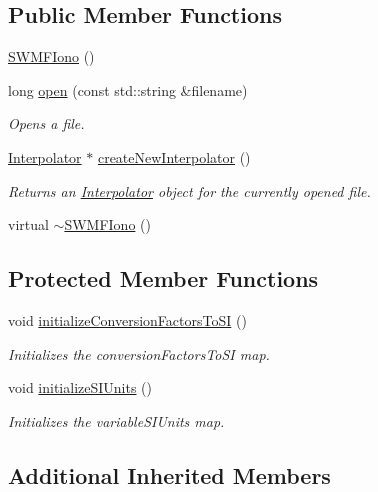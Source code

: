 \subsection*{Public Member Functions}
\begin{DoxyCompactItemize}
\item 
\hyperlink{classccmc_1_1_s_w_m_f_iono_a2af98741608e42f05e0a5c1b9e8bb412}{S\-W\-M\-F\-Iono} ()
\item 
long \hyperlink{classccmc_1_1_s_w_m_f_iono_ad9e939763ca7026d551925d83c9f1425}{open} (const std\-::string \&filename)
\begin{DoxyCompactList}\small\item\em Opens a file. \end{DoxyCompactList}\item 
\hyperlink{classccmc_1_1_interpolator}{Interpolator} $\ast$ \hyperlink{classccmc_1_1_s_w_m_f_iono_a53d2bdb34290a7c9da48982f7262762c}{create\-New\-Interpolator} ()
\begin{DoxyCompactList}\small\item\em Returns an \hyperlink{classccmc_1_1_interpolator}{Interpolator} object for the currently opened file.  \end{DoxyCompactList}\item 
virtual \hyperlink{classccmc_1_1_s_w_m_f_iono_abfae78a79ffb7e59eb8cba61dda20b7c}{$\sim$\-S\-W\-M\-F\-Iono} ()
\end{DoxyCompactItemize}
\subsection*{Protected Member Functions}
\begin{DoxyCompactItemize}
\item 
void \hyperlink{classccmc_1_1_s_w_m_f_iono_a19279179873a44a59bf71651d5aadd27}{initialize\-Conversion\-Factors\-To\-S\-I} ()
\begin{DoxyCompactList}\small\item\em Initializes the conversion\-Factors\-To\-S\-I map.  \end{DoxyCompactList}\item 
void \hyperlink{classccmc_1_1_s_w_m_f_iono_a20417d2b847bc12764ec3112d7166590}{initialize\-S\-I\-Units} ()
\begin{DoxyCompactList}\small\item\em Initializes the variable\-S\-I\-Units map.  \end{DoxyCompactList}\end{DoxyCompactItemize}
\subsection*{Additional Inherited Members}


